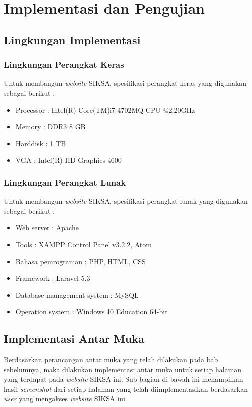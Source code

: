 \chapter{Implementasi dan Pengujian}
\label{chap:implementasi_dan_pengujian}

\section{Lingkungan Implementasi}
\label{sec:lingkungan_implementasi}

\subsection{Lingkungan Perangkat Keras}
\label{sec:lingkungan_perangkat_keras}
Untuk membangun \textit{website} SIKSA, spesifikasi perangkat keras yang digunakan sebagai berikut :
\begin{itemize}
	\item Processor : Intel(R) Core(TM)i7-4702MQ CPU @2.20GHz
	\item Memory : DDR3 8 GB
	\item Harddisk : 1 TB
	\item VGA : Intel(R) HD Graphics 4600
\end{itemize}

\subsection{Lingkungan Perangkat Lunak}
\label{sec:lingkungan_perangkat_lunak}
Untuk membangun \textit{website} SIKSA, spesifikasi perangkat lunak yang digunakan sebagai berikut :
\begin{itemize}
	\item Web server : Apache
	\item Tools : XAMPP Control Panel v3.2.2, Atom
	\item Bahasa pemrograman : PHP, HTML, CSS
	\item Framework : Laravel 5.3
	\item Database management system : MySQL 
	\item Operation system : Windows 10 Education 64-bit
\end{itemize}

\section{Implementasi Antar Muka}
\label{sec:implementasi_antar_muka}
Berdasarkan perancangan antar muka yang telah dilakukan pada bab sebelumnya, maka dilakukan implementasi antar muka untuk setiap halaman yang terdapat pada \textit{website} SIKSA ini. Sub bagian di bawah ini menampilkan hasil \textit{screenshot} dari setiap halaman yang telah diimplementasikan berdasarkan \textit{user} yang mengakses \textit{website} SIKSA ini.

